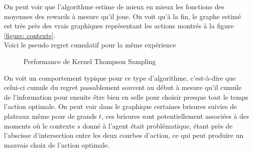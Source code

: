 \documentclass[letterpaper,11pt]{article}
\begin{document}
On peut voir que l'algorithme estime de mieux en mieux les fonctions des moyennes des rewards à mesure qu'il joue. On voit qu'à la fin, le graphe estimé est très près des vrais graphiques représentant les actions montrés à la figure \ref{figure: contexte}.\\

Voici le pseudo regret cumulatif pour la même expérience

\begin{figure}[H]
\label{figure: pseudo KTS}
\caption{Performance de Kernel Thompson Sampling}
\begin{center}
\end{center}
\end{figure}

On voit un comportement typique pour ce type d'algorithme, c'est-à-dire que celui-ci cumule du regret passablement souvent au début à mesure qu'il cumule de l'information pour ensuite être bien en selle pour choisir presque tout le temps l'action optimale. On peut voir dans le graphique certaines brisures suivies de plateaux même pour de grands $t$, ces brisures sont potentiellement associées à des moments où le contexte $s$ donné à l'agent était problématique, étant près de l'abscisse d'intersection entre les deux courbes d'action, ce qui peut produire un mauvais choix de l'action optimale. 
\end{document}

